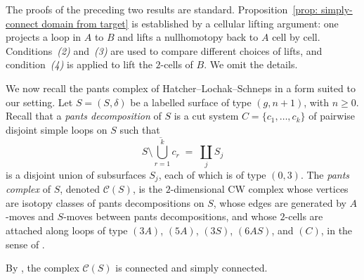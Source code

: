 \documentclass{amsart}
\newcommand{\pantscpx}{\mathcal{C}}
\theoremstyle{definition}
\numberwithin{equation}{section}
\begin{document}
The proofs of the preceding two results are standard. Proposition~\ref{prop: simply-connect domain from target} is established by a cellular lifting argument: one projects a loop in $A$ to $B$ and lifts a nullhomotopy back to $A$ cell by cell. Conditions~\emph{(2)} and~\emph{(3)} are used to compare different choices of lifts, and condition~\emph{(4)} is applied to lift the $2$-cells of $B$. We omit the details.

We now recall the pants complex of Hatcher--Lochak--Schneps \cite{hls} in a form suited to our setting. Let $S=(S,\delta)$ be a labelled surface of type $(g,n+1)$, with $n\ge 0$. Recall that a \emph{pants decomposition} of $S$ is a cut system $C=\{c_1,\ldots,c_k\}$ of pairwise disjoint simple loops on $S$ such that
    \[\overline{S\setminus \bigcup_{r=1}^k c_r}\;=\;\coprod_j S_j\]
is a disjoint union of subsurfaces $S_j$, each of which is of type $(0,3)$. The \emph{pants complex} of $S$, denoted $\pantscpx(S)$, is the $2$-dimensional CW complex whose vertices are isotopy classes of pants decompositions on $S$, whose edges are generated by $A$-moves and $S$-moves between pants decompositions, and whose $2$-cells are attached along loops of type $(3A)$, $(5A)$, $(3S)$, $(6AS)$, and $(C)$, in the sense of \cite[Section~2]{hls}.

By \cite[Theorem~2]{hls}, the complex $\pantscpx(S)$ is connected and simply connected.
\end{document}
